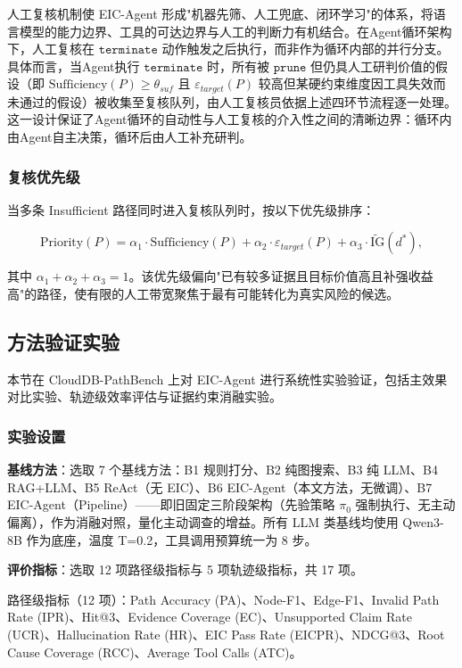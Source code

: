 \documentclass[a4paper,12pt]{ctexart}
\begin{document}
人工复核机制使 EIC-Agent 形成"机器先筛、人工兜底、闭环学习"的体系，将语言模型的能力边界、工具的可达边界与人工的判断力有机结合。在Agent循环架构下，人工复核在 $\texttt{terminate}$ 动作触发之后执行，而非作为循环内部的并行分支。具体而言，当Agent执行 $\texttt{terminate}$ 时，所有被 $\texttt{prune}$ 但仍具人工研判价值的假设（即 $\text{Sufficiency}(P) \geq \theta_{suf}$ 且 $\varepsilon_{target}(P)$ 较高但某硬约束维度因工具失效而未通过的假设）被收集至复核队列，由人工复核员依据上述四环节流程逐一处理。这一设计保证了Agent循环的自动性与人工复核的介入性之间的清晰边界：循环内由Agent自主决策，循环后由人工补充研判。

\subsubsection{复核优先级}

当多条 Insufficient 路径同时进入复核队列时，按以下优先级排序：

\[
\text{Priority}(P) = \alpha_1 \cdot \text{Sufficiency}(P) + \alpha_2 \cdot \varepsilon_{target}(P) + \alpha_3 \cdot \widetilde{\text{IG}}(d^*),
\]

其中 $\alpha_1 + \alpha_2 + \alpha_3 = 1$。该优先级偏向"已有较多证据且目标价值高且补强收益高"的路径，使有限的人工带宽聚焦于最有可能转化为真实风险的候选。

\subsection{方法验证实验}

本节在 CloudDB-PathBench 上对 EIC-Agent 进行系统性实验验证，包括主效果对比实验、轨迹级效率评估与证据约束消融实验。

\subsubsection{实验设置}

\textbf{基线方法}：选取 7 个基线方法：B1 规则打分、B2 纯图搜索、B3 纯 LLM、B4 RAG+LLM、B5 ReAct（无 EIC）、B6 EIC-Agent（本文方法，无微调）、B7 EIC-Agent（Pipeline）——即旧固定三阶段架构（先验策略 $\pi_0$ 强制执行、无主动偏离），作为消融对照，量化主动调查的增益。所有 LLM 类基线均使用 Qwen3-8B 作为底座，温度 T=0.2，工具调用预算统一为 8 步。

\textbf{评价指标}：选取 12 项路径级指标与 5 项轨迹级指标，共 17 项。

路径级指标（12 项）：Path Accuracy (PA)、Node-F1、Edge-F1、Invalid Path Rate (IPR)、Hit@3、Evidence Coverage (EC)、Unsupported Claim Rate (UCR)、Hallucination Rate (HR)、EIC Pass Rate (EICPR)、NDCG@3、Root Cause Coverage (RCC)、Average Tool Calls (ATC)。
\end{document}
